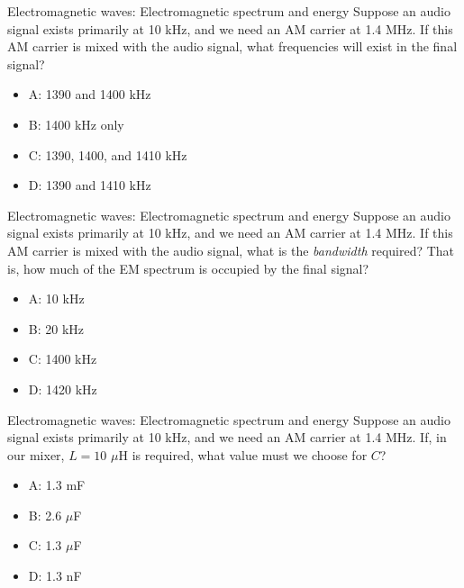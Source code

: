 \documentclass{beamer}
\begin{document}
\begin{frame}{Electromagnetic waves: Electromagnetic spectrum and energy}
Suppose an audio signal exists primarily at 10 kHz, and we need an AM carrier at 1.4 MHz.  If this AM carrier is mixed with the audio signal, what frequencies will exist in the final signal?
\begin{itemize}
\item A: 1390 and 1400 kHz
\item B: 1400 kHz only
\item C: 1390, 1400, and 1410 kHz
\item D: 1390 and 1410 kHz
\end{itemize}
\end{frame}

\begin{frame}{Electromagnetic waves: Electromagnetic spectrum and energy}
Suppose an audio signal exists primarily at 10 kHz, and we need an AM carrier at 1.4 MHz.  If this AM carrier is mixed with the audio signal, what is the \textit{bandwidth} required?  That is, how much of the EM spectrum is occupied by the final signal?
\begin{itemize}
\item A: 10 kHz
\item B: 20 kHz
\item C: 1400 kHz
\item D: 1420 kHz
\end{itemize}
\end{frame}

\begin{frame}{Electromagnetic waves: Electromagnetic spectrum and energy}
Suppose an audio signal exists primarily at 10 kHz, and we need an AM carrier at 1.4 MHz.  If, in our mixer, $L = 10$ $\mu$H is required, what value must we choose for $C$?
\begin{itemize}
\item A: 1.3 mF
\item B: 2.6 $\mu$F
\item C: 1.3 $\mu$F
\item D: 1.3 nF
\end{itemize}
\end{frame}
\end{document}
